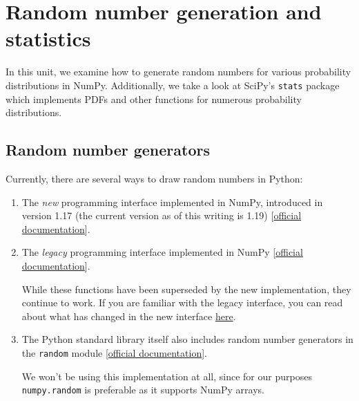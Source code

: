 \documentclass[10pt]{scrartcl}
\begin{document}
    
    \maketitle
    \tableofcontents

    

    
    \hypertarget{random-number-generation-and-statistics}{%
\section{Random number generation and
statistics}\label{random-number-generation-and-statistics}}

In this unit, we examine how to generate random numbers for various
probability distributions in NumPy. Additionally, we take a look at
SciPy's \texttt{stats} package which implements PDFs and other functions
for numerous probability distributions.

\hypertarget{random-number-generators}{%
\subsection{Random number generators}\label{random-number-generators}}

Currently, there are several ways to draw random numbers in Python:

\begin{enumerate}
\def\labelenumi{\arabic{enumi}.}
\item
  The \emph{new} programming interface implemented in NumPy, introduced
  in version 1.17 (the current version as of this writing is 1.19)
  {[}\href{https://numpy.org/doc/stable/reference/random/generator.html}{official
  documentation}{]}.
\item
  The \emph{legacy} programming interface implemented in NumPy
  {[}\href{https://numpy.org/doc/stable/reference/random/legacy.html}{official
  documentation}{]}.

  While these functions have been superseded by the new implementation,
  they continue to work. If you are familiar with the legacy interface,
  you can read about what has changed in the new interface
  \href{https://numpy.org/doc/stable/reference/random/new-or-different.html}{here}.
\item
  The Python standard library itself also includes random number
  generators in the \texttt{random} module
  {[}\href{https://docs.python.org/dev/library/random.html\#random.random}{official
  documentation}{]}.

  We won't be using this implementation at all, since for our purposes
  \texttt{numpy.random} is preferable as it supports NumPy arrays.
\end{enumerate}
\end{document}
